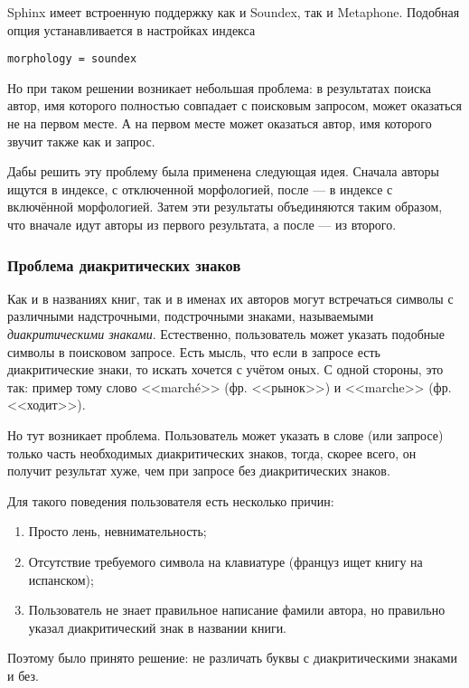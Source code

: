 Sphinx имеет встроенную поддержку как и Soundex, так и Metaphone. Подобная опция устанавливается в настройках индекса
\begin{verbatim}
morphology = soundex
\end{verbatim}

Но при таком решении возникает небольшая проблема: в результатах поиска автор, имя которого полностью совпадает с поисковым запросом, может оказаться не на первом месте. А на первом месте может оказаться автор, имя которого звучит также как и запрос.

Дабы решить эту проблему была применена следующая идея. 
Сначала авторы ищутся в индексе, с отключенной морфологией, после --- в индексе с включённой морфологией.
Затем эти результаты объединяются таким образом, что вначале идут авторы из первого результата, а после --- из второго.

\subsubsection{Проблема диакритических знаков}

Как и в названиях книг, так и в именах их авторов могут встречаться символы с различными надстрочными, подстрочными знаками, называемыми {\em диакритическими знаками}. Естественно, пользователь может указать подобные символы в поисковом запросе.
Есть мысль, что если в запросе есть диакритические знаки, то искать хочется с учётом оных. С одной стороны, это так: пример тому слово <<marché>> (фр. <<рынок>>) и <<marche>> (фр. <<ходит>>). 

Но тут возникает проблема. Пользователь может указать в слове (или запросе) только часть необходимых диакритических знаков, тогда, скорее всего, он получит результат хуже, чем при запросе без диакритических знаков. 

Для такого поведения пользователя есть несколько причин:
\begin{enumerate}
    \item Просто лень, невнимательность;
    \item Отсутствие требуемого символа на клавиатуре (француз ищет книгу на испанском);
    \item Пользователь не знает правильное написание фамили автора, но правильно указал диакритический знак в названии книги.
\end{enumerate}

Поэтому было принято решение: не различать буквы с диакритическими знаками и без.

